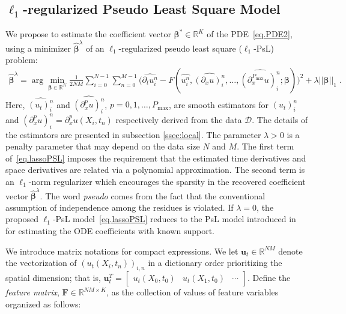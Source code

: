 \documentclass[a4paper,11pt]{article}
\newcommand{\bbeta}{\bm{\beta}}
\theoremstyle{definition}
\begin{document}
 \subsection{$\ell_1$-regularized Pseudo Least Square Model}
We propose to estimate the coefficient vector $\bbeta^*\in\mathbb{R}^K$ of the PDE~\eqref{eq.PDE2}, using a minimizer $\widehat{\bbeta}^\lambda$ of an $\ell_1$-regularized pseudo least square ($\ell_1$-PsL) problem:
\begin{align}
	\widehat{\bbeta}^\lambda = \arg\min_{\bbeta\in\mathbb{R}^K} \frac{1}{2NM}\sum_{i=0}^{N-1}\sum_{n=0}^{M-1} \big(\widehat{\partial_tu_i^n}-F(\widehat{u_i^n},\widehat{(\partial_xu)_i^n},\dots,\widehat{(\partial_x^{P_{\max}}u)_i^n};\bbeta)\big)^2+\lambda||\bbeta||_1\;.\label{eq.lassoPSL}
\end{align}
Here, $\widehat{(u_t)_i^n}$ and $\widehat{(\partial_x^pu)_i^n}$, $p=0,1,\dots,P_{\max}$, are smooth estimators for $(u_t)_i^n$ and $(\partial_x^p u)_i^n=\partial_x^p u(X_i,t_n)$ respectively derived from the data $\mathcal{D}$.  The details of the estimators are presented in subsection \ref{ssec:local}.   The parameter $\lambda>0$ is a penalty parameter that may depend on the data size $N$ and $M$. The first term of~\eqref{eq.lassoPSL} imposes the requirement that the estimated time derivatives and space derivatives are related via a polynomial approximation. The second term is an $\ell_1$-norm regularizer which encourages the sparsity in the recovered coefficient vector $\widehat{\bbeta}^\lambda$. The word \textit{pseudo} comes from the fact that the conventional assumption of independence among the residues is violated. If $\lambda=0$, the proposed $\ell_1$-PsL model~\eqref{eq.lassoPSL} reduces to the PsL model introduced in~\cite{liang2008parameter} for estimating the ODE coefficients with known support.

We introduce matrix notations for compact expressions. We let $\mathbf{u}_t\in\mathbb{R}^{NM}$ denote the vectorization of $(u_t(X_i,t_n))_{i,n}$ in a dictionary order prioritizing the spatial dimension; that is, $\mathbf{u}_t^T=\begin{bmatrix}
u_t(X_0,t_0)&u_t(X_1,t_0)&\cdots	
\end{bmatrix}
$. Define the \textit{feature matrix}, $\mathbf{F}\in\mathbb{R}^{NM\times K}$, as the collection of values of feature variables organized as follows:
\end{document}
